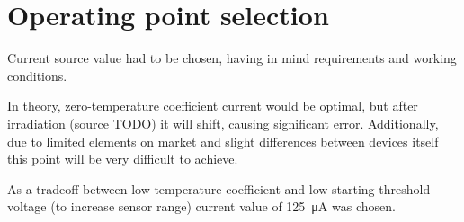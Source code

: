 \section{Operating point selection}
    Current source value had to be chosen, having in mind requirements and working conditions.

    In theory, zero-temperature coefficient current would be optimal, but after irradiation (source TODO) it will shift, causing significant error. Additionally, due to limited elements on market and slight differences between devices itself this point will be very difficult to achieve.

    As a tradeoff between low temperature coefficient and low starting threshold voltage (to increase sensor range) current value of \SI{125}{\micro\ampere} was chosen.
